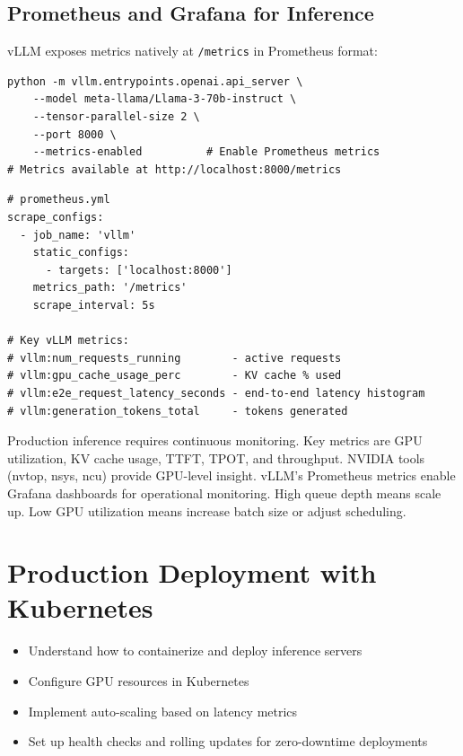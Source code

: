 \documentclass[11pt, twoside, openright]{book}
\newenvironment{learningobjectives}
  {\begin{tcolorbox}[enhanced, breakable,
    colback={rgb,255:red,232;green,240;blue,255},
    colframe=NavyBlue, boxrule=1.5pt, arc=4pt,
    title={\bfseries Learning Objectives},
    fonttitle=\bfseries\color{white},
    attach boxed title to top left={yshift=-2mm, xshift=5mm},
    boxed title style={colback=NavyBlue, arc=2pt}]
  \begin{itemize}[leftmargin=1.5em, itemsep=2pt]}
  {\end{itemize}\end{tcolorbox}}
\newenvironment{chapsummary}
  {\begin{tcolorbox}[enhanced, breakable,
    colback={rgb,255:red,245;green,245;blue,225},
    colframe=AccentOrange, boxrule=1.5pt, arc=4pt,
    title={\bfseries Chapter Summary},
    fonttitle=\bfseries\color{white},
    attach boxed title to top left={yshift=-2mm, xshift=5mm},
    boxed title style={colback=AccentOrange, arc=2pt}]}
  {\end{tcolorbox}}
\begin{document}
\section{Prometheus and Grafana for Inference}

vLLM exposes metrics natively at \texttt{/metrics} in Prometheus format:

\begin{lstlisting}[style=bashstyle, caption={Starting vLLM with metrics}]
python -m vllm.entrypoints.openai.api_server \
    --model meta-llama/Llama-3-70b-instruct \
    --tensor-parallel-size 2 \
    --port 8000 \
    --metrics-enabled          # Enable Prometheus metrics
# Metrics available at http://localhost:8000/metrics
\end{lstlisting}

\begin{lstlisting}[style=yamlstyle, caption={Prometheus scrape config for vLLM}]
# prometheus.yml
scrape_configs:
  - job_name: 'vllm'
    static_configs:
      - targets: ['localhost:8000']
    metrics_path: '/metrics'
    scrape_interval: 5s

# Key vLLM metrics:
# vllm:num_requests_running        - active requests
# vllm:gpu_cache_usage_perc        - KV cache % used
# vllm:e2e_request_latency_seconds - end-to-end latency histogram
# vllm:generation_tokens_total     - tokens generated
\end{lstlisting}

\begin{chapsummary}
Production inference requires continuous monitoring.  Key metrics are GPU
utilization, KV cache usage, TTFT, TPOT, and throughput.  NVIDIA tools (nvtop,
nsys, ncu) provide GPU-level insight.  vLLM's Prometheus metrics enable Grafana
dashboards for operational monitoring.  High queue depth means scale up.  Low GPU
utilization means increase batch size or adjust scheduling.
\end{chapsummary}

\chapter{Production Deployment with Kubernetes}
\label{ch:kubernetes}

\begin{learningobjectives}
  \item Understand how to containerize and deploy inference servers
  \item Configure GPU resources in Kubernetes
  \item Implement auto-scaling based on latency metrics
  \item Set up health checks and rolling updates for zero-downtime deployments
\end{learningobjectives}
\end{document}
